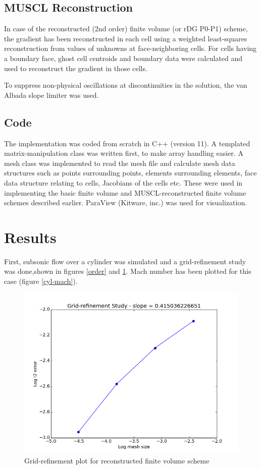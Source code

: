 \documentclass[letterpaper,twoside,12pt]{article}
\begin{document}
\subsection{MUSCL Reconstruction}
In case of the reconstructed (2nd order) finite volume (or rDG P0-P1) scheme, the gradient has been reconstructed in each cell using a weighted least-squares reconstruction from values of unknowns at face-neighboring cells. For cells having a boundary face, ghost cell centroids and boundary data were calculated and used to reconstruct the gradient in those cells.

To suppress non-physical oscillations at discontinuities in the solution, the van Albada slope limiter was used.

\subsection{Code}
The implementation was coded from scratch in C++ (version 11). A templated matrix-manipulation class was written first, to make array handling easier. A mesh class was implemented to read the mesh file and calculate mesh data structures such as points surrounding points, elements surrounding elements, face data structure relating to cells, Jacobians of the cells etc. These were used in implementing the basic finite volume and MUSCL-reconstructed finite volume schemes described earlier. ParaView (Kitware, inc.) was used for visualization.

\section{Results}

First, subsonic flow over a cylinder was simulated and a grid-refinement study was done,shown in figures \ref{order} and \ref{order-recons}. Mach number has been plotted for this case (figure \ref{cyl-mach}).

\begin{figure}[!H]
	\centering
	\includegraphics[scale=.5]{convergence-reconstructedFV}
	\caption{Grid-refinement plot for reconstructed finite volume scheme}
	\label{order-recons}
\end{figure}
\end{document}
